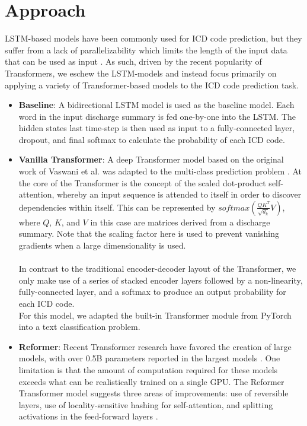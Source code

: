 \documentclass{article}
\begin{document}
\section{Approach}
    	LSTM-based models have been commonly used for ICD code prediction, but they suffer from a lack of parallelizability which limits the length of the input data that can be used as input \cite{shi2017towards} \cite{ayyar2016tagging}. As such, driven by the recent popularity of Transformers, we eschew the LSTM-models and instead focus primarily on applying a variety of Transformer-based models to the ICD code prediction task.
    	\begin{itemize}
    		\item
		    	\textbf{Baseline}: A bidirectional LSTM model is used as the baseline model. Each word in the input discharge summary is fed one-by-one into the LSTM. The hidden states last  time-step is then used as input to a fully-connected layer, dropout, and final softmax to calculate the probability of each ICD code. 
    		\item
			\textbf{Vanilla Transformer}: A deep Transformer model based on the original work of Vaswani et al. was adapted to the multi-class prediction problem \cite{vaswani2017attention}. At the core of the Transformer is the concept of the scaled dot-product self-attention, whereby an input sequence is attended to itself in order to discover dependencies within itself. This can be represented by  $softmax(\frac{QK^T}{\sqrt{d_k}}V)$, where $Q$, $K$, and $V$ in this case are matrices derived from a discharge summary. Note that the scaling factor here is used to prevent vanishing gradients when a large dimensionality is used.\\\\
		    		In contrast to the traditional encoder-decoder layout of the Transformer, we only make use of a series of stacked encoder layers followed by a non-linearity, fully-connected layer, and a softmax to produce an output probability for each ICD code. \\
		    		For this model, we adapted the built-in Transformer module from PyTorch into a text classification problem. 
		\item
			\textbf{Reformer}: Recent Transformer research have favored the creation of large models, with over 0.5B parameters reported in the largest models \cite{kitaev2020reformer}. One limitation is that the amount of computation required for these models exceeds what can be realistically trained on a single GPU. The Reformer Transformer model suggests three areas of improvements: use of reversible layers, use of locality-sensitive hashing for self-attention, and splitting activations in the feed-forward layers \cite{kitaev2020reformer}. \\\\

\end{itemize}
\end{document}

